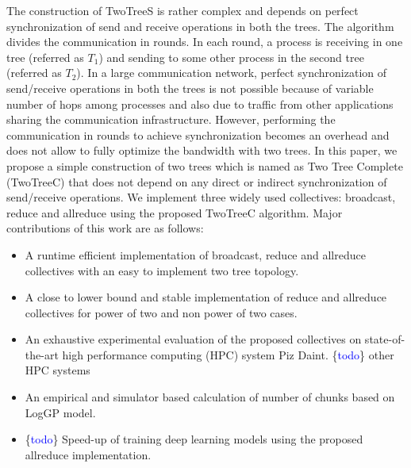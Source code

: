 \documentclass[sigplan,review,anonymous]{acmart}\settopmatter{printfolios=true,printccs=false,printacmref=false}
\begin{document}
The construction of TwoTreeS is rather complex and depends on perfect synchronization of send and receive operations in both the trees. The algorithm divides the communication in rounds. In each round, a process is receiving in one tree (referred as $T_1$) and sending to some other process in the second tree (referred as $T_2$). In a large communication network, perfect synchronization of send/receive operations in both the trees is not possible because of variable number of hops among processes and also due to traffic from other applications sharing the communication infrastructure. However, performing the communication in rounds to achieve synchronization becomes an overhead and does not allow to fully optimize the bandwidth with two trees. In this paper, we propose a simple construction of two trees which is named as Two Tree Complete (TwoTreeC) that does not depend on any direct or indirect synchronization of send/receive operations. We implement three widely used collectives: broadcast, reduce and allreduce using the proposed TwoTreeC algorithm. Major contributions of this work are as follows:

\begin{itemize}
\item A runtime efficient implementation of broadcast, reduce and allreduce collectives with an easy to implement two tree topology.
\item A close to lower bound and stable implementation of reduce and allreduce collectives for power of two and non power of two cases.
\item An exhaustive experimental evaluation of the proposed collectives on state-of-the-art high performance computing (HPC) system Piz Daint. \ifcmts \{\textcolor{blue}{todo}\} other HPC systems \fi
\item An empirical and simulator based calculation of number of chunks based on LogGP \cite{alexandrov_loggp:_1995} model.
\ifcmts \item \{\textcolor{blue}{todo}\} Speed-up of training deep learning models using the proposed allreduce implementation. \fi
\end{itemize}





\end{document}
